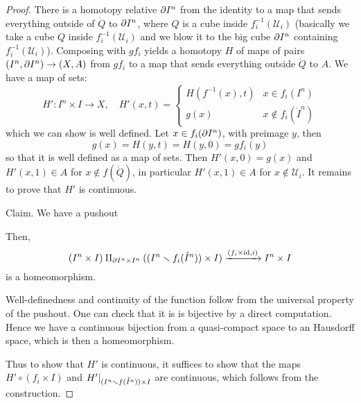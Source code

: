 \begin{proof}
There is a homotopy relative $\partial I^n$ from the identity to a map that sends everything outside of $\ring Q$ to $\partial I^n$, where $Q$ is a cube inside $f^{-1}_i(\mathcal{U}_i)$ (basically we take a cube $Q$ inside $f^{-1}_i(\mathcal{U}_i)$ and we blow it to the big cube $\partial I^n$ containing $f^{-1}_i(\mathcal{U}_i)$). Composing with $gf_i$ yields a homotopy $H$ of maps of pairs $(I^n,\partial I^n)\to(X,A)$ from $gf_i$ to a map that sends everything outside $\ring Q$ to $A$. We have a map of sets:
\[H':I^n\times I\to X,\quad H'(x,t)=\begin{cases}H(f^{-1}(x),t) & x\in f_i(I^n) \\ g(x) & x\not\in f_i(\mathring{I}^n)\end{cases}\]
which we can show is well defined. Let $x\in f_i(\partial I^n)$, with preimage $y$, then\normalmarginpar{} \[g(x)=H(y,t)=H(y,0)=gf_i(y)\] so that it is well defined as a map of sets. Then $H'(x,0)=g(x)$ and $H'(x,1)\in A$ for $x\not\in f(\mathring{Q})$, in particular $H'(x,1)\in A$ for $x\not\in\mathcal{U}_i$. It remains to prove that $H'$ is continuous.

Claim. We have a pushout
\begin{center}
\end{center}
Then,
\[(I^n\times I)\amalg_{\partial I^n\times I^n} ((I^n\smallsetminus f_i(\mathring{I}^n))\times I)\xrightarrow{(f_i\times\operatorname{id},i)} I^n\times I\]
is a homeomorphism.

\begin{claimproof}
Well-definedness and continuity of the function follow from the universal property of the pushout. One can check that it is is bijective by a direct computation. Hence we have a continuous bijection from a quasi-compact space to an Hausdorff space, which is then a homeomorphism. 
\end{claimproof}

Thus to show that $H'$ is continuous, it suffices to show that the maps $H'\circ (f_i\times I)$ and $H'|_{(I^n\smallsetminus f(\mathring I^n))\times I}$ are continuous, which follows from the construction.
\end{proof}

